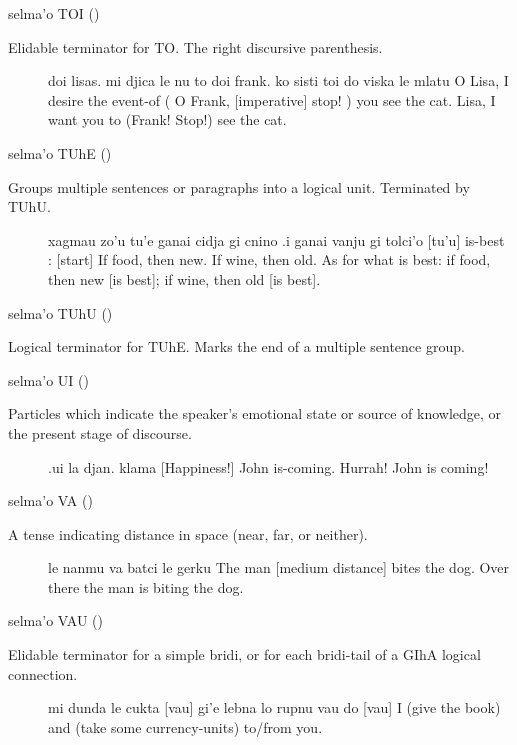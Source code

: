 selma'o TOI () 

Elidable terminator for TO. The right discursive
    parenthesis.
\begin{description}
\item[] doi lisas. mi djica le nu to doi frank. ko sisti toi do viska le mlatu O Lisa, I desire the event-of ( O Frank, [imperative] stop! ) you see the cat. Lisa, I want you to (Frank! Stop!) see the cat.
\end{description}

selma'o TUhE () 

Groups multiple sentences or paragraphs into a logical unit.
    Terminated by TUhU.
\begin{description}
\item[] xagmau zo'u tu'e ganai cidja gi cnino .i ganai vanju gi tolci'o [tu'u] is-best : [start] If food, then new. If wine, then old. As for what is best: if food, then new [is best]; if wine, then old [is best].
\end{description}

selma'o TUhU () 

Logical terminator for TUhE. Marks the end of a multiple
    sentence group.

selma'o UI ()

Particles which indicate the speaker's emotional state or
    source of knowledge, or the present stage of discourse.
\begin{description}
\item[] .ui la djan. klama [Happiness!] John is-coming. Hurrah! John is coming!
\end{description}

selma'o VA () 

A tense indicating distance in space (near, far, or
    neither).
\begin{description}
\item[] le nanmu va batci le gerku The man [medium distance] bites the dog. Over there the man is biting the dog.
\end{description}

selma'o VAU () 

Elidable terminator for a simple bridi, or for each
    bridi-tail of a GIhA logical connection.
\begin{description}
\item[] mi dunda le cukta [vau] gi'e lebna lo rupnu vau do [vau] I (give the book) and (take some currency-units) to/from you.
\end{description}

